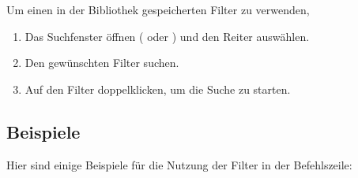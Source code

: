 \documentclass[letterpaper,10pt,german]{sphinxmanual}
\begin{document}
\sphinxAtStartPar
Um einen in der Bibliothek gespeicherten Filter zu verwenden,
\begin{enumerate}
%
\item {} 
\sphinxAtStartPar
Das Suchfenster öffnen ( oder ) und den Reiter  auswählen.

\item {} 
\sphinxAtStartPar
Den gewünschten Filter suchen.

\item {} 
\sphinxAtStartPar
Auf den Filter doppelklicken, um die Suche zu starten.

\end{enumerate}


\subsection{Beispiele}
\label{\detokenize{annexe_filtres:exemples}}
\sphinxAtStartPar
Hier sind einige Beispiele für die Nutzung der Filter in der Befehlszeile:
\end{document}
